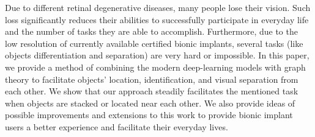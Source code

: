 Due to different retinal degenerative diseases, many people lose their vision. Such loss significantly reduces their abilities to successfully participate in everyday life and the number of tasks they are able to accomplish. Furthermore, due to the low resolution of currently available certified bionic implants, several tasks (like objects differentiation and separation) are very hard or impossible. In this paper, we provide a method of combining the modern deep-learning models with graph theory to facilitate objects' location, identification, and visual separation from each other. We show that our approach steadily facilitates the mentioned task when objects are stacked or located near each other. We also provide ideas of possible improvements and extensions to this work to provide bionic implant users a better experience and facilitate their everyday lives.